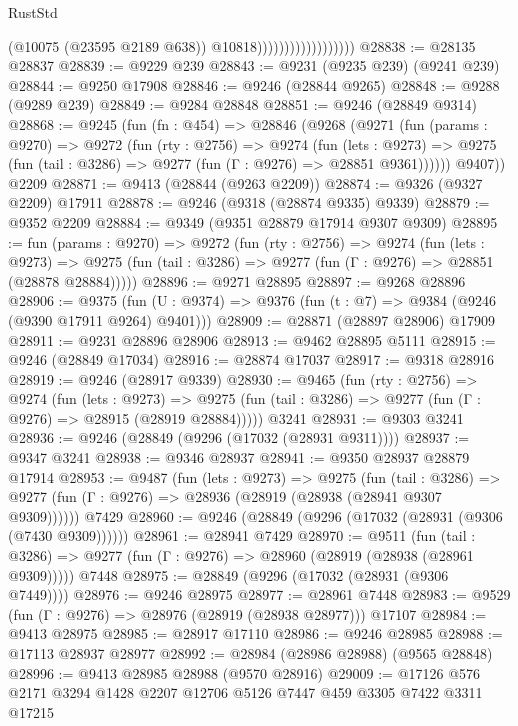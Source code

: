 \begin{lexlean}{RustStd}
\begin{coremodule}
                                        (@10075 (@23595 @2189 @638))
                                        @10818))))))))))))))))))
@28838 := @28135 @28837
@28839 := @9229 @239
@28843 := @9231 (@9235 @239) (@9241 @239)
@28844 := @9250 @17908
@28846 := @9246 (@28844 @9265)
@28848 := @9288 (@9289 @239)
@28849 := @9284 @28848
@28851 := @9246 (@28849 @9314)
@28868 := @9245
    (fun (fn : @454) =>
    @28846
      (@9268
        (@9271
          (fun (params : @9270) =>
          @9272
            (fun (rty : @2756) =>
            @9274
              (fun (lets : @9273) =>
              @9275 (fun (tail : @3286) => @9277 (fun (Γ : @9276) => @28851 @9361))))))
        @9407))
    @2209
@28871 := @9413 (@28844 (@9263 @2209))
@28874 := @9326 (@9327 @2209) @17911
@28878 := @9246 (@9318 (@28874 @9335) @9339)
@28879 := @9352 @2209
@28884 := @9349 (@9351 @28879 @17914 @9307 @9309)
@28895 := fun (params : @9270) =>
  @9272
    (fun (rty : @2756) =>
    @9274
      (fun (lets : @9273) =>
      @9275 (fun (tail : @3286) => @9277 (fun (Γ : @9276) => @28851 (@28878 @28884)))))
@28896 := @9271 @28895
@28897 := @9268 @28896
@28906 := @9375
    (fun (U : @9374) => @9376 (fun (t : @7) => @9384 (@9246 (@9390 @17911 @9264) @9401)))
@28909 := @28871 (@28897 @28906) @17909
@28911 := @9231 @28896 @28906
@28913 := @9462 @28895 @5111
@28915 := @9246 (@28849 @17034)
@28916 := @28874 @17037
@28917 := @9318 @28916
@28919 := @9246 (@28917 @9339)
@28930 := @9465
    (fun (rty : @2756) =>
    @9274
      (fun (lets : @9273) =>
      @9275 (fun (tail : @3286) => @9277 (fun (Γ : @9276) => @28915 (@28919 @28884)))))
    @3241
@28931 := @9303 @3241
@28936 := @9246 (@28849 (@9296 (@17032 (@28931 @9311))))
@28937 := @9347 @3241
@28938 := @9346 @28937
@28941 := @9350 @28937 @28879 @17914
@28953 := @9487
    (fun (lets : @9273) =>
    @9275
      (fun (tail : @3286) =>
      @9277 (fun (Γ : @9276) => @28936 (@28919 (@28938 (@28941 @9307 @9309))))))
    @7429
@28960 := @9246 (@28849 (@9296 (@17032 (@28931 (@9306 (@7430 @9309))))))
@28961 := @28941 @7429
@28970 := @9511
    (fun (tail : @3286) => @9277 (fun (Γ : @9276) => @28960 (@28919 (@28938 (@28961 @9309)))))
    @7448
@28975 := @28849 (@9296 (@17032 (@28931 (@9306 @7449))))
@28976 := @9246 @28975
@28977 := @28961 @7448
@28983 := @9529 (fun (Γ : @9276) => @28976 (@28919 (@28938 @28977))) @17107
@28984 := @9413 @28975
@28985 := @28917 @17110
@28986 := @9246 @28985
@28988 := @17113 @28937 @28977
@28992 := @28984 (@28986 @28988) (@9565 @28848)
@28996 := @9413 @28985 @28988 (@9570 @28916)
@29009 := @17126 @576 @2171 @3294 @1428 @2207 @12706 @5126 @7447 @459 @3305 @7422 @3311 @17215

\end{coremodule}
\end{lexlean}
